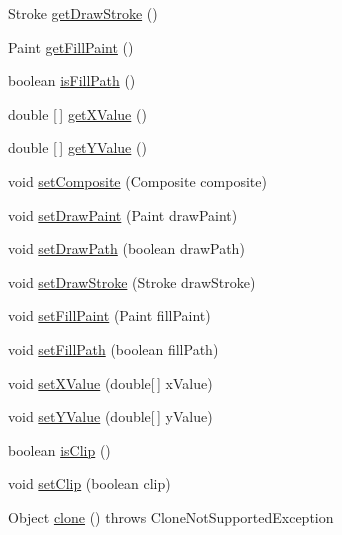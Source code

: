 \begin{DoxyCompactItemize}
Stroke \mbox{\hyperlink{classorg_1_1jfree_1_1chart_1_1_clip_path_a53e8cbff9759439139040faeb6c02add}{get\+Draw\+Stroke}} ()
\item 
Paint \mbox{\hyperlink{classorg_1_1jfree_1_1chart_1_1_clip_path_a32d45c05b299fa295c4acbc55859da65}{get\+Fill\+Paint}} ()
\item 
boolean \mbox{\hyperlink{classorg_1_1jfree_1_1chart_1_1_clip_path_a1023f0c763dc3ead38cd380779045d39}{is\+Fill\+Path}} ()
\item 
double \mbox{[}$\,$\mbox{]} \mbox{\hyperlink{classorg_1_1jfree_1_1chart_1_1_clip_path_af26c333bb76abf237e764c84bdc41e67}{get\+X\+Value}} ()
\item 
double \mbox{[}$\,$\mbox{]} \mbox{\hyperlink{classorg_1_1jfree_1_1chart_1_1_clip_path_a580e1b4b1dd07b839201efd41d2be572}{get\+Y\+Value}} ()
\item 
void \mbox{\hyperlink{classorg_1_1jfree_1_1chart_1_1_clip_path_aa5ea3fcd80ea309a0eb96fda3e85f8fe}{set\+Composite}} (Composite composite)
\item 
void \mbox{\hyperlink{classorg_1_1jfree_1_1chart_1_1_clip_path_a470e8173222a56f7d9c7aca89aa68561}{set\+Draw\+Paint}} (Paint draw\+Paint)
\item 
void \mbox{\hyperlink{classorg_1_1jfree_1_1chart_1_1_clip_path_a97c4dfcb6c0ca03c24bd93518be9a460}{set\+Draw\+Path}} (boolean draw\+Path)
\item 
void \mbox{\hyperlink{classorg_1_1jfree_1_1chart_1_1_clip_path_a188e2c291241a31abd983e5f158b5be0}{set\+Draw\+Stroke}} (Stroke draw\+Stroke)
\item 
void \mbox{\hyperlink{classorg_1_1jfree_1_1chart_1_1_clip_path_a60c415b239dfcc0185865e8ff5f13b51}{set\+Fill\+Paint}} (Paint fill\+Paint)
\item 
void \mbox{\hyperlink{classorg_1_1jfree_1_1chart_1_1_clip_path_a6ca62840ceec1f54853dadd6a7cc69f1}{set\+Fill\+Path}} (boolean fill\+Path)
\item 
void \mbox{\hyperlink{classorg_1_1jfree_1_1chart_1_1_clip_path_a5ca008b7be40dc7397ed8652e6e28fe2}{set\+X\+Value}} (double\mbox{[}$\,$\mbox{]} x\+Value)
\item 
void \mbox{\hyperlink{classorg_1_1jfree_1_1chart_1_1_clip_path_aa83937e9ffac80489830dd43f4692405}{set\+Y\+Value}} (double\mbox{[}$\,$\mbox{]} y\+Value)
\item 
boolean \mbox{\hyperlink{classorg_1_1jfree_1_1chart_1_1_clip_path_a037cf5d915c8865eaca7211c08dd1ba0}{is\+Clip}} ()
\item 
void \mbox{\hyperlink{classorg_1_1jfree_1_1chart_1_1_clip_path_a9a8f93c76548c46f0c1cdae46cbef6f5}{set\+Clip}} (boolean clip)
\item 
Object \mbox{\hyperlink{classorg_1_1jfree_1_1chart_1_1_clip_path_af0a754baf80f01fa8f406440eb9cb55b}{clone}} ()  throws Clone\+Not\+Supported\+Exception 
\end{DoxyCompactItemize}


